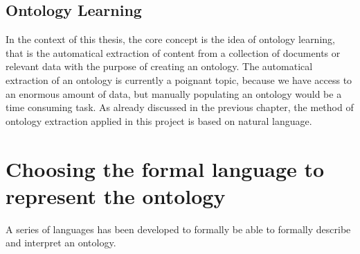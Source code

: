 \documentclass[LaM,oneside,binding=0.6cm]{sapthesis}
\begin{document}

\subsection{Ontology Learning}
In the context of this thesis, the core concept is the idea of ontology learning, that is the automatical extraction of content from a collection of documents or relevant data with the purpose of creating an ontology. 
The automatical extraction of an ontology is currently a poignant topic, because we have access to an enormous amount of data, but manually populating an ontology would be a time consuming task. 
As already discussed in the previous chapter, the method of ontology extraction applied in this project is based on natural language.

\section{Choosing the formal language to represent the ontology}
A series of languages has been developed to formally be able to formally describe and interpret an ontology.
\end{document}
